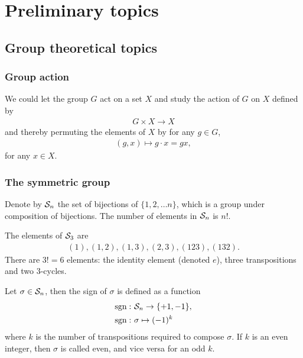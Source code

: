 \clearpage{\thispagestyle{empty}}
\section{Preliminary topics}

\subsection{Group theoretical topics}

\subsubsection{Group action}

We could let the group $G$ act on a set $X$ and study the action of $G$ on $X$ defined by
\begin{align*}
	G \times X \rightarrow X
\end{align*}
and thereby permuting the elements of $X$ by for any $g \in G$,
\begin{align*}
	(g,x) \mapsto g \cdot x = gx,
\end{align*}
for any $x \in X$.

\subsubsection{The symmetric group}

Denote by $\mathcal{S}_n$ the set of bijections of $\{1, 2, \dots n\}$, which is a group under composition of bijections. The number of elements in $\mathcal{S}_n$ is $n!$.

\begin{example}
	The elements of $\mathcal{S}_3$ are
	\begin{align*}
		(1), (1,2), (1,3), (2,3), (123), (132).
	\end{align*}
	There are $3! = 6$ elements: the identity element (denoted $e$), three transpositions and two 3-cycles.
\end{example}

\begin{definition}
	Let $\sigma \in \mathcal{S}_n$, then the sign of $\sigma$ is defined as a function
	\begin{align*}
		\text{sgn}: & \ \mathcal{S}_n \rightarrow \{+1, -1\},\\
		\text{sgn}: & \ \sigma \mapsto (-1)^k
	\end{align*}
	where $k$ is the number of transpositions required to compose $\sigma$. If $k$ is an even integer, then $\sigma$ is called even, and vice versa for an odd $k$.
\end{definition}

